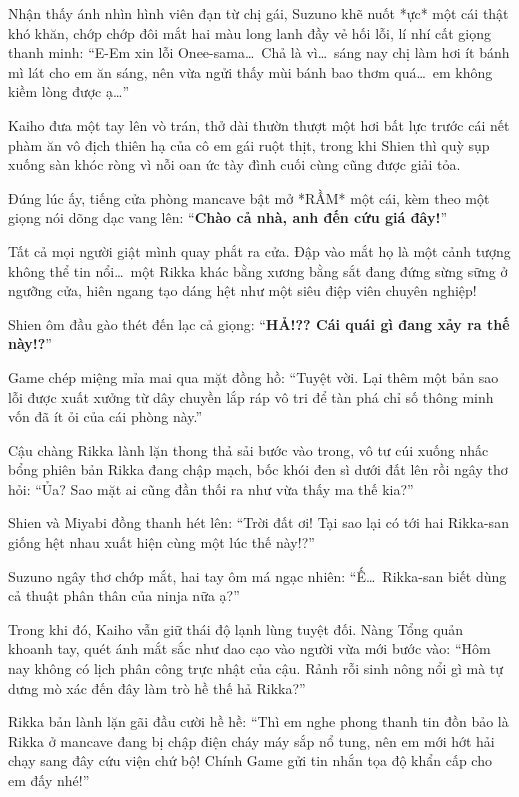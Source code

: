 \documentclass[../main.tex]{subfiles}
\begin{document}
Nhận thấy ánh nhìn hình viên đạn từ chị gái, Suzuno khẽ nuốt *ực* một cái thật khó khăn, chớp chớp đôi mắt hai màu long lanh đầy vẻ hối lỗi, lí nhí cất giọng thanh minh: ``E-Em xin lỗi Onee-sama\dots\ Chả là vì\dots\ sáng nay chị làm hơi ít bánh mì lát cho em ăn sáng, nên vừa ngửi thấy mùi bánh bao thơm quá\dots\ em không kiềm lòng được ạ\dots''

Kaiho đưa một tay lên vò trán, thở dài thườn thượt một hơi bất lực trước cái nết phàm ăn vô địch thiên hạ của cô em gái ruột thịt, trong khi Shien thì quỳ sụp xuống sàn khóc ròng vì nỗi oan ức tày đình cuối cùng cũng được giải tỏa.

Đúng lúc ấy, tiếng cửa phòng mancave bật mở *RẦM* một cái, kèm theo một giọng nói dõng dạc vang lên: ``\textbf{Chào cả nhà, anh đến cứu giá đây!}''

Tất cả mọi người giật mình quay phắt ra cửa. Đập vào mắt họ là một cảnh tượng không thể tin nổi\dots\ một Rikka khác bằng xương bằng sắt đang đứng sừng sững ở ngưỡng cửa, hiên ngang tạo dáng hệt như một siêu điệp viên chuyên nghiệp!


Shien ôm đầu gào thét đến lạc cả giọng: ``\textbf{HẢ!?? Cái quái gì đang xảy ra thế này!?}''

Game chép miệng mỉa mai qua mặt đồng hồ: ``Tuyệt vời. Lại thêm một bản sao lỗi được xuất xưởng từ dây chuyền lắp ráp vô tri để tàn phá chỉ số thông minh vốn đã ít ỏi của cái phòng này.''

Cậu chàng Rikka lành lặn thong thả sải bước vào trong, vô tư cúi xuống nhấc bổng phiên bản Rikka đang chập mạch, bốc khói đen sì dưới đất lên rồi ngây thơ hỏi: ``Ủa? Sao mặt ai cũng đần thối ra như vừa thấy ma thế kia?''

Shien và Miyabi đồng thanh hét lên: ``Trời đất ơi! Tại sao lại có tới hai Rikka-san giống hệt nhau xuất hiện cùng một lúc thế này!?''

Suzuno ngây thơ chớp mắt, hai tay ôm má ngạc nhiên: ``Ế\dots\ Rikka-san biết dùng cả thuật phân thân của ninja nữa ạ?''

Trong khi đó, Kaiho vẫn giữ thái độ lạnh lùng tuyệt đối. Nàng Tổng quản khoanh tay, quét ánh mắt sắc như dao cạo vào người vừa mới bước vào: ``Hôm nay không có lịch phân công trực nhật của cậu. Rảnh rỗi sinh nông nổi gì mà tự dưng mò xác đến đây làm trò hề thế hả Rikka?''

Rikka bản lành lặn gãi đầu cười hề hề: ``Thì em nghe phong thanh tin đồn bảo là Rikka ở mancave đang bị chập điện cháy máy sắp nổ tung, nên em mới hớt hải chạy sang đây cứu viện chứ bộ! Chính Game gửi tin nhắn tọa độ khẩn cấp cho em đấy nhé!''
\end{document}
